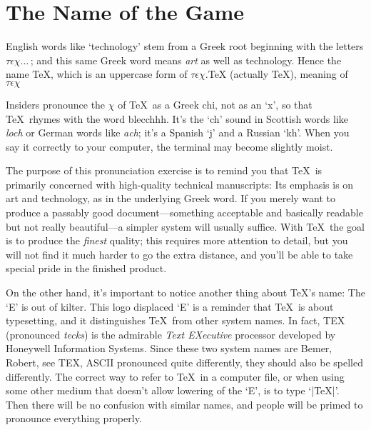 
\chapter*{The Name of the Game}
English words like `technology' stem from a Greek root beginning with
the letters $\tau\epsilon\chi\ldots\,$; and this same Greek word means {\sl
art\/} as well as technology. Hence the name \TeX, which is an
uppercase form of $\tau\epsilon\chi$.{TeX (actually \TeX), meaning of}
$\tau\epsilon\chi$

Insiders pronounce the $\chi$ of \TeX\ as a Greek chi, not as an `x', so that
\TeX\ rhymes with the word blecchhh. It's the `ch' sound in Scottish words
like {\sl loch\/} or German words like {\sl ach\/}; it's a Spanish `j' and a
Russian `kh'. When you say it correctly to your computer, the terminal
may become slightly moist.

The purpose of this pronunciation exercise is to remind you that \TeX\ is
primarily concerned with high-quality technical manuscripts: Its emphasis is
on art and technology, as in the underlying Greek word. If you merely want
to produce a passably good document---something acceptable and basically
readable but not really beautiful---a simpler system will usually suffice.
With \TeX\ the goal is to produce the {\sl finest\/} quality; this requires
more attention to detail, but you will not find it much harder to go the
extra distance, and you'll be able to take special pride in the finished
product. 

On the other hand, it's important to notice another thing about \TeX's name:
The `E' is out of kilter. This {logo}
displaced `E' is a reminder that \TeX\ is about typesetting, and it
distinguishes \TeX\ from other system names. In fact, {TEX} (pronounced
{\sl tecks\/}) is the admirable {\sl Text EXecutive\/} processor developed by
{Honeywell Information Systems}. Since these two system names are
{Bemer, Robert, see TEX, ASCII}
pronounced quite differently, they should also be spelled differently. The
correct way to refer to \TeX\ in a computer file, or when using some other
medium that doesn't allow lowering of the `E', is to type `|TeX|'. Then
there will be no confusion with similar names, and people will be
primed to pronounce everything properly.
